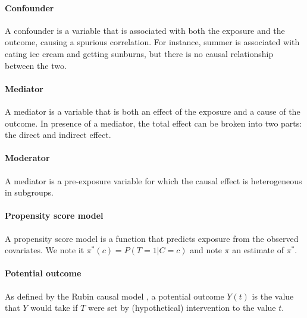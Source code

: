 \paragraph{Confounder}{A confounder is a variable that is associated with both the exposure and the outcome, causing a spurious correlation. For instance, summer is associated with eating ice cream and getting sunburns, but there is no causal relationship between the two.}
\paragraph{Mediator}{A mediator is a variable that is both an effect of the exposure and a cause of the outcome. In presence of a mediator, the total effect can be broken into two parts: the direct and indirect effect.}
\paragraph{Moderator}{A mediator is a pre-exposure variable for which the causal effect is heterogeneous in subgroups.}
\paragraph{Propensity score model}{A propensity score model is a function that predicts exposure from the observed covariates. We note it $\pi^*(c) = P(T=1|C=c)$ and note $\pi$ an estimate of $\pi^*$.}
\paragraph{Potential outcome}{As defined by the Rubin causal model , a potential outcome $Y(t)$ is the value that $Y$ would take if $T$ were set by (hypothetical) intervention to the value $t$.}
